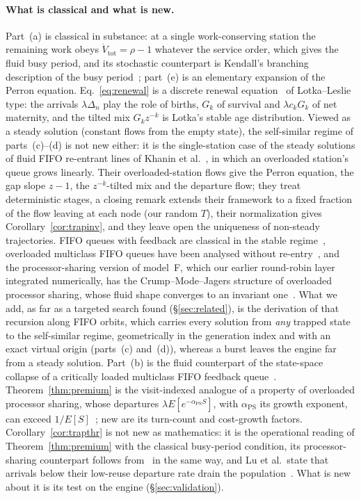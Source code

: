 \paragraph{What is classical and what is new.} Part~(a) is classical in substance: at a single work-conserving station the
remaining work obeys $\dot V_{\mathrm{tot}}=\rho-1$ whatever the service order, which gives the fluid busy period, and its
stochastic counterpart is Kendall's branching description of the busy period~\citep{kendall1951some}; part~(e) is an
elementary expansion of the Perron equation. Eq.~\eqref{eq:renewal} is a discrete renewal equation~\citep{feller1968introduction}
of Lotka--Leslie type: the arrivals $\lambda\Delta_n$ play the role of births, $G_k$ of survival and $\lambda c_kG_k$ of net
maternity, and the tilted mix $G_kz^{-k}$ is Lotka's stable age distribution. Viewed as a steady solution (constant flows from the empty state), the
self-similar regime of parts~(c)--(d) is not new either: it is the single-station case of the steady solutions of fluid FIFO
re-entrant lines of Khanin et al.~\citep{khanin2001steady}, in which an overloaded station's queue grows linearly. Their
overloaded-station flows give the Perron equation, the gap slope $z-1$, the $z^{-k}$-tilted mix and the departure flow; they treat
deterministic stages, a closing remark extends their framework to a fixed fraction of the flow leaving at each node (our random
$T$), their normalization gives Corollary~\ref{cor:trapinv}, and they leave open the uniqueness of non-steady trajectories. FIFO queues with feedback are classical in the stable
regime~\citep{takacs1963feedback,vandenberg1989deterministic}, overloaded multiclass FIFO queues have been analysed without
re-entry~\citep{jennings2013fluid}, and the processor-sharing version of model~F, which our earlier round-robin layer
integrated numerically, has the Crump--Mode--Jagers structure of overloaded processor sharing, whose fluid shape converges to
an invariant one~\citep{grishechkin1992processor,jeanmarie1994transient,puha2006overloaded}. What we add, as far as a targeted
search found (\S\ref{sec:related}), is the derivation of that recursion along FIFO orbits, which carries every solution from
\emph{any} trapped state to the self-similar regime, geometrically in the generation index and with an exact virtual origin
(parts~(c) and~(d)), whereas a burst leaves the engine far from a steady solution. Part~(b) is the fluid counterpart of the
state-space collapse of a critically loaded multiclass FIFO feedback queue~\citep{reiman1988multiclass,dai1995multiclass}.
Theorem~\ref{thm:premium} is the visit-indexed analogue of a property of overloaded processor sharing, whose departures
$\lambda E[e^{-\alpha_{\mathrm{PS}}S}]$, with $\alpha_{\mathrm{PS}}$ its growth exponent, can exceed
$1/E[S]$~\citep{jeanmarie1994transient}; new are its turn-count and cost-growth factors. Corollary~\ref{cor:trapthr} is not new as
mathematics: it is the operational reading of Theorem~\ref{thm:premium} with the classical busy-period condition, its
processor-sharing counterpart follows from~\citep{jeanmarie1994transient} in the same way, and Lu et al.\ state that arrivals below
their low-reuse departure rate drain the population~\citep{lu2026cachetrap}. What is new about it is its test on the engine
(\S\ref{sec:validation}).

